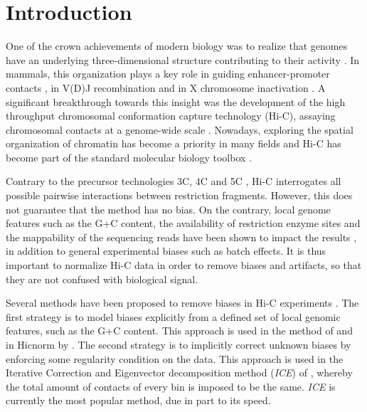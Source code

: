 \documentclass[a4,center,fleqn]{NAR}
\begin{document}
\section{Introduction}

One of the crown achievements of modern biology was to realize that
genomes have an underlying three-dimensional structure contributing to
their activity \citep{rowley2016three, dekker20163d, pezic2017more}. In
mammals, this organization plays a key role in guiding enhancer-promoter
contacts \citep{de2013topology}, in V(D)J recombination
\citep{choi2014ctcf} and in X chromosome inactivation \citep{galupa2015x}.
A significant breakthrough towards this insight was the development of
the high throughput chromosomal conformation capture technology (Hi-C),
assaying chromosomal contacts at a genome-wide scale
\citep{lieberman2009comprehensive}. Nowadays, exploring the spatial
organization of chromatin has become a priority in many fields and Hi-C
has become part of the standard molecular biology toolbox
\citep{dekker2013exploring}.

Contrary to the precursor technologies 3C, 4C and 5C
\citep{dekker2002capturing, simonis2006nuclear,
dostie2006chromosome,de2012decade}, Hi-C interrogates all possible
pairwise interactions between restriction fragments. However, this does
not guarantee that the method has no bias.  On the contrary, local genome
features such as the G+C content, the availability of restriction enzyme
sites and the mappability of the sequencing reads have been shown to
impact the results \citep{yaffe2011probabilistic}, in addition to general
experimental biases such as batch effects. It is thus important to
normalize Hi-C data in order to remove biases and artifacts, so that they
are not confused with biological signal.

Several methods have been proposed to remove biases in Hi-C experiments
\citep{schmitt2016genome}. The first strategy is to model biases
explicitly from a defined set of local genomic features, such as the G+C
content. This approach is used in the method of
\cite{yaffe2011probabilistic} and in Hicnorm by \cite{hu2012hicnorm}. The
second strategy is to implicitly correct unknown biases by enforcing some
regularity condition on the data. This approach is used in the
Iterative Correction and Eigenvector decomposition method (\textit{ICE})
of \cite{imakaev2012iterative}, whereby the total amount of contacts of
every bin is imposed to be the same. \textit{ICE} is currently the most
popular method, due in part to its speed.
\end{document}
